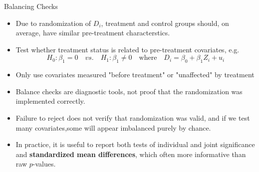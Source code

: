 \documentclass[11pt,aspectratio=169]{beamer}
\begin{document}
\begin{frame}





\end{frame}
\begin{frame}{Balancing Checks}
\begin{itemize}
  \item Due to randomization of $D_i$, treatment and control groups should, on average, have similar pre-treatment characterstics.
  \item Test whether treatment status is related to pre-treatment covariates, e.g.$$H_0:\beta_1=0 \quad vs. \quad H_1: \beta_1\neq 0 \quad \text{where} \quad D_i=\beta_0+\beta_1 Z_i+u_i$$
  \item Only use covariates measured "before treatment" or "unaffected" by treatment
  \item Balance checks are diagnostic tools, not proof that the randomization was implemented correctly.
  \item Failure to reject does not verify that randomization was valid, and if we test many covariates,some will appear imbalanced purely by chance.
  \item In practice, it is useful to report both tests of individual and joint significance and \textbf{standardized mean differences}, which often more informative than raw $p$-values.

\end{itemize}

\end{frame}{}
\begin{frame}












\end{frame}
\end{document}
